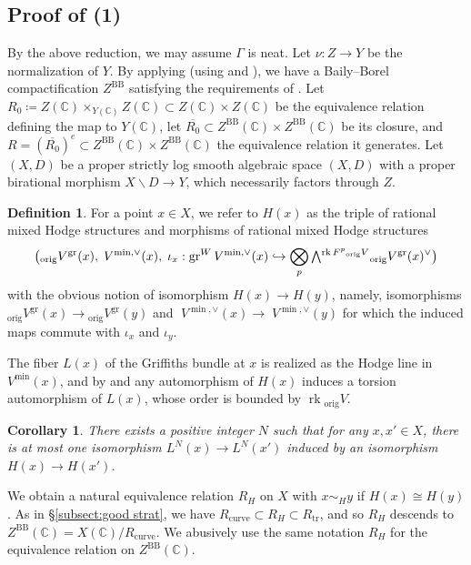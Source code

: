 \documentclass{amsart}
\newcommand{\bs}{\backslash}
\newcommand{\ol}{\overline}
\newtheorem{cor}[theorem]{Corollary}
\theoremstyle{definition}
\newtheorem{defn}[theorem]{Definition}
\theoremstyle{remark}
\def\bC{\mathbb{C}}
\def\gr{\operatorname{gr}}
\def\trans{\mathrm{tr}}
\def\mini{\mathrm{min}}
\def\orig{\mathrm{orig}}
\def\rk{\operatorname{rk}}
\def\BB{\mathrm{BB}}
\def\curve{\mathrm{curve}}
\numberwithin{equation}{section}
\newcommand{\Exterior}{\mathchoice{{\textstyle\bigwedge}}%
    {{\bigwedge}}%
    {{\textstyle\wedge}}%
    {{\scriptstyle\wedge}}}
\begin{document}
\subsection{Proof of  (1)}
\def\Ynormal{{Z}}

By the above reduction, we may assume $\Gamma$ is neat.  Let $\nu:\Ynormal\to Y$ be the normalization of $Y$.  By applying  (using  and ), we have a Baily--Borel compactification $\Ynormal^\BB$ satisfying the requirements of .  Let $R_0\coloneqq  \Ynormal(\bC)\times_{Y(\bC)} \Ynormal(\bC)\subset \Ynormal(\bC)\times \Ynormal(\bC)$ be the equivalence relation defining the map to $Y(\bC)$, let $\ol{R_0}\subset \Ynormal^\BB(\bC)\times \Ynormal^\BB(\bC)$ be its closure, and $R=(\ol{R_0})^e\subset \Ynormal^\BB(\bC)\times \Ynormal^\BB(\bC)$ the equivalence relation it generates.  Let $(X,D)$ be a proper strictly log smooth algebraic space $(X,D)$ with a proper birational morphism $X\bs D\to Y$, which necessarily factors through $Z$.  



\begin{defn}

For a point $x\in X$, we refer to $H(x)$ as the triple of rational mixed Hodge structures and morphisms of rational mixed Hodge structures $$\big({_{\orig}V^{\gr}}(x),\;V^{\min,\vee}(x),\;\iota_x:\gr^W V^{\min,\vee}(x)\hookrightarrow \bigotimes_p \Exterior^{\rk F^p{_\orig V}} {_{\orig}}V^{\gr}(x)^{\vee}\big)$$
with the obvious notion of isomorphism $H(x)\to H(y)$, namely, isomorphisms ${_{\orig}V^{\gr}}(x)\to {_{\orig}V^{\gr}}(y)$ and $\;V^{\min,\vee}(x)\to \;V^{\min,\vee}(y)$ for which the induced maps commute with $\iota_x$ and $\iota_y$.

\end{defn}

The fiber $L(x)$ of the Griffiths bundle at $x$ is realized as the Hodge line in $V^{\mini}(x)$, and by  and  any automorphism of $H(x)$ induces a torsion automorphism of $L(x)$, whose order is bounded by $\rk {_\orig V}$.
\begin{cor}\label{cor:trivial on power}There exists a positive integer $N$ such that for any $x,x'\in X$, there is at most one isomorphism $L^N(x)\to L^N(x')$ induced by an isomorphism $H(x)\to H(x')$.
\end{cor}


We obtain a natural equivalence relation $R_{H}$ on $X$ with $x\sim_H y $ if $H(x)\cong H(y)$.  As in \S\ref{subsect:good strat}, we have $R_{\curve}\subset R_{H}\subset R_{\trans}$, and so $R_{H}$ descends to $Z^\BB(\bC)=X(\bC)/R_\curve$.  We abusively use the same notation $R_H$ for the equivalence relation on $Z^\BB(\bC)$.
\end{document}
